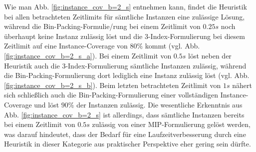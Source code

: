 Wie man Abb. \ref{fig:instance_cov_b=2_s} entnehmen kann, findet die Heuristik bei allen betrachteten Zeitlimits für sämtliche Instanzen eine zulässige Lösung, während die Bin-Packing-Formulie\-/rung bei einem Zeitlimit von $0.25s$ noch überhaupt keine Instanz zulässig löst und die 3-Index-Formulierung bei diesem Zeitlimit auf eine Instance-Coverage von $80 \%$ kommt (vgl. Abb. \ref{fig:instance_cov_b=2_s_a}). Bei einem Zeitlimit von $0.5s$ löst neben der Heuristik auch die 3-Index-Formulierung sämtliche Instanzen zulässig, während die Bin-Packing-Formulierung dort lediglich eine Instanz zulässig löst (vgl. Abb. \ref{fig:instance_cov_b=2_s_b}). Beim letzten betrachteten Zeitlimit von $1s$ nähert sich schließlich auch die Bin-Packing-Formulierung einer vollständigen Instance-Coverage und löst $90 \%$ der Instanzen zulässig.\newline
Die wesentliche Erkenntnis aus Abb. \ref{fig:instance_cov_b=2_s} ist allerdings, dass sämtliche Instanzen bereits bei einem Zeitlimit von $0.5s$ zulässig von einer MIP-Formulierung gelöst werden, was darauf hindeutet, dass der Bedarf für eine Laufzeitverbesserung durch eine Heuristik in dieser Kategorie aus praktischer Perspektive eher gering sein dürfte.

